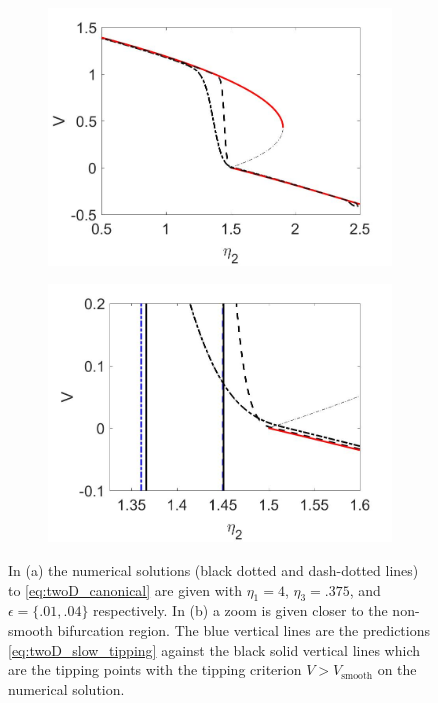 \begin{figure}[H]
\centering
\begin{subfigure}{.5\textwidth}
 \centering
 \includegraphics[width=\linewidth]{twoD/slow_bif_diagram.jpg}
 \caption{}
\end{subfigure}%
\begin{subfigure}{.5\textwidth}
 \centering
 \includegraphics[width=\linewidth]{twoD/slow_bif_diagram_zoom.jpg}
 \caption{}
\end{subfigure}
\caption{In (a) the numerical solutions (black dotted and dash-dotted lines) to \eqref{eq:twoD_canonical} are given with $\eta_1=4$, $\eta_3=.375$, and $\epsilon=\{.01,.04\}$ respectively. In (b) a zoom is given closer to the non-smooth bifurcation region. The blue vertical lines are the predictions \eqref{eq:twoD_slow_tipping} against the black solid vertical lines which are the tipping points with the tipping criterion $V>V_{\text{smooth}}$ on the numerical solution.}
\label{fig:twoD_slow_Vnumerics}
\end{figure}

